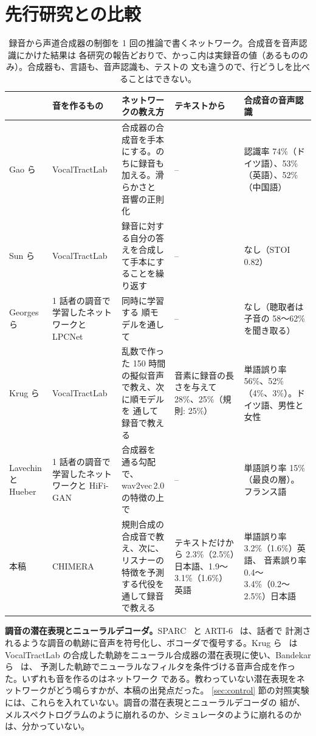 \documentclass[10pt,a4paper,twocolumn]{article}
\begin{document}
\section{先行研究との比較}\label{sec:related}
\begin{table}[t]
\centering\footnotesize\setlength{\tabcolsep}{4pt}
\caption{録音から声道合成器の制御を 1 回の推論で書くネットワーク。合成音を音声認識にかけた結果は
各研究の報告どおりで、かっこ内は実録音の値（あるもののみ）。合成器も、言語も、音声認識も、テストの
文も違うので、行どうしを比べることはできない。}
\label{tab:related}
\begin{tabular}{@{}p{25mm}p{27mm}p{50mm}p{27mm}p{31mm}@{}}
\toprule
& 音を作るもの & ネットワークの教え方 & テキストから & 合成音の音声認識\\
\midrule
Gao ら~\cite{gao} & VocalTractLab & 合成器の合成音を手本にする。のちに録音も加える。滑らかさと
音響の正則化 & -- & 認識率 74\%（ドイツ語）、53\%（英語）、52\%（中国語）\\
\addlinespace
Sun ら~\cite{sun} & VocalTractLab & 録音に対する自分の答えを合成して手本にすることを繰り返す &
-- & なし（STOI 0.82）\\
\addlinespace
Georges ら~\cite{georges} & 1 話者の調音で学習したネットワークと LPCNet & 同時に学習する
順モデルを通して & -- & なし（聴取者は子音の 58〜62\% を聞き取る）\\
\addlinespace
Krug ら~\cite{krug} & VocalTractLab & 乱数で作った 150 時間の擬似音声で教え、次に順モデルを
通して録音で教える & 音素に録音の長さを与えて 28\%、25\%（規則: 25\%） & 単語誤り率 56\%、52\%
（4\%、3\%）。ドイツ語、男性と女性\\
\addlinespace
Lavechin と Hueber~\cite{lavechin} & 1 話者の調音で学習したネットワークと HiFi-GAN & 合成器を
通る勾配で、wav2vec\,2.0 の特徴の上で & -- & 単語誤り率 15\%（最良の層）。フランス語\\
\addlinespace
本稿 & CHIMERA & 規則合成の合成音で教え、次に、リスナーの特徴を予測する代役を通して録音で教える &
テキストだけから 2.3\%（2.5\%）日本語、1.9〜3.1\%（1.6\%）英語 & 単語誤り率 3.2\%（1.6\%）英語、
音素誤り率 0.4〜3.4\%（0.2〜2.5\%）日本語\\
\bottomrule
\end{tabular}
\end{table}

\textbf{調音の潜在表現とニューラルデコーダ。}SPARC~\cite{sparc} と ARTI-6~\cite{arti6} は、話者で
計測されるような調音の軌跡に音声を符号化し、ボコーダで復号する。Krug ら~\cite{tt2} は
VocalTractLab の合成した軌跡をニューラル合成器の潜在表現に使い、Bandekar ら~\cite{asftts} は、
予測した軌跡でニューラルなフィルタを条件づける音声合成を作った。いずれも音を作るのはネットワーク
である。教わっていない潜在表現をネットワークがどう鳴らすかが、本稿の出発点だった。
\ref{sec:control} 節の対照実験には、これらを入れていない。調音の潜在表現とニューラルデコーダの
組が、メルスペクトログラムのように崩れるのか、シミュレータのように崩れるのかは、分かっていない。
\end{document}
